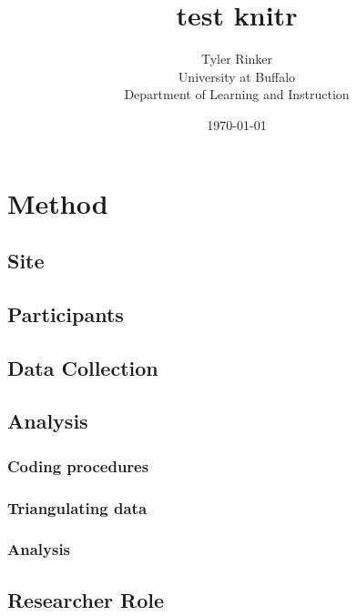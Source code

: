 



\title{test knitr}
\author{Tyler Rinker\\University at Buffalo\\Department of Learning and Instruction}
\date{\today}
\maketitle

\section{Method}
\subsection{Site}
\subsection{Participants}
\subsection{Data Collection}
\subsection{Analysis}
\subsubsection{Coding procedures}
\subsubsection{Triangulating data}
\subsubsection{Analysis}
\subsection{Researcher Role}

